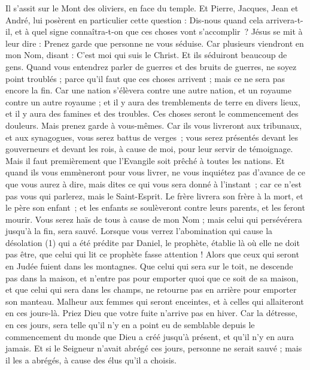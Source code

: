\begin{multicols}{2}
Il s’assit sur le Mont des oliviers, en face du temple. Et Pierre, Jacques, Jean et André, lui posèrent en particulier cette question :
Dis-nous quand cela arrivera-t-il, et à quel signe connaîtra-t-on que ces choses vont s'accomplir ?
Jésus se mit à leur dire : Prenez garde que personne ne vous séduise.
Car plusieurs viendront en mon Nom, disant : C'est moi qui suis le Christ. Et ils séduiront beaucoup de gens.
Quand vous entendrez parler de guerres et des bruits de guerres, ne soyez point troublés ; parce qu'il faut que ces choses arrivent ; mais ce ne sera pas encore la fin.
Car une nation s'élèvera contre une autre nation, et un royaume contre un autre royaume ; et il y aura des tremblements de terre en divers lieux, et il y aura des famines et des troubles. Ces choses seront le commencement des douleurs.
Mais prenez garde à vous-mêmes. Car ils vous livreront aux tribunaux, et aux synagogues, vous serez battus de verges ; vous serez présentés devant les gouverneurs et devant les rois, à cause de moi, pour leur servir de témoignage.
Mais il faut premièrement que l'Evangile soit prêché à toutes les nations.
Et quand ils vous emmèneront pour vous livrer, ne vous inquiétez pas d’avance de ce que vous aurez à dire, mais dites ce qui vous sera donné à l’instant ; car ce n’est pas vous qui parlerez, mais le Saint-Esprit.
Le frère livrera son frère à la mort, et le père son enfant ; et les enfants se soulèveront contre leurs parents, et les feront mourir.
Vous serez haïs de tous à cause de mon Nom ; mais celui qui persévérera jusqu’à la fin, sera sauvé.
Lorsque vous verrez l'abomination qui cause la désolation (1) qui a été prédite par Daniel, le prophète, établie là où elle ne doit pas être, que celui qui lit ce prophète fasse attention ! Alors que ceux qui seront en Judée fuient dans les montagnes.
Que celui qui sera sur le toit, ne descende pas dans la maison, et n’entre pas pour emporter quoi que ce soit de sa maison,
et que celui qui sera dans les champs, ne retourne pas en arrière pour emporter son manteau.
Malheur aux femmes qui seront enceintes, et à celles qui allaiteront en ces jours-là.
Priez Dieu que votre fuite n'arrive pas en hiver.
Car la détresse, en ces jours, sera telle qu’il n’y en a point eu de semblable depuis le commencement du monde que Dieu a créé jusqu’à présent, et qu’il n’y en aura jamais.
Et si le Seigneur n’avait abrégé ces jours, personne ne serait sauvé ; mais il les a abrégés, à cause des élus qu'il a choisis.

\end{multicols}
